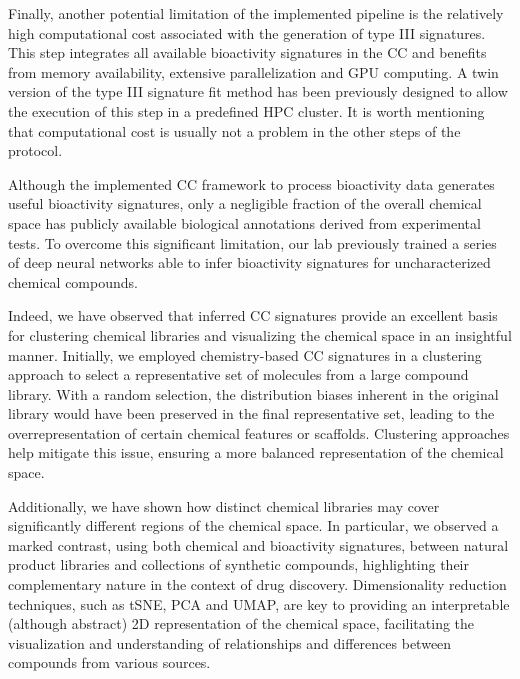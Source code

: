 Finally, another potential limitation of the implemented pipeline is the relatively high computational cost associated with the generation of type III signatures. This step integrates all available bioactivity signatures in the CC and benefits from memory availability, extensive parallelization and GPU computing. A twin version of the type III signature fit method has been previously designed to allow the execution of this step in a predefined HPC cluster. It is worth mentioning that computational cost is usually not a problem in the other steps of the protocol.  


Although the implemented CC framework to process bioactivity data generates useful bioactivity signatures, only a negligible fraction of the overall chemical space has publicly available biological annotations derived from experimental tests. To overcome this significant limitation, our lab previously trained a series of deep neural networks able to infer bioactivity signatures for uncharacterized chemical compounds. 

Indeed, we have observed that inferred CC signatures provide an excellent basis for clustering chemical libraries and visualizing the chemical space in an insightful manner. Initially, we employed chemistry-based CC signatures in a clustering approach to select a representative set of molecules from a large compound library. With a random selection, the distribution biases inherent in the original library would have been preserved in the final representative set, leading to the overrepresentation of certain chemical features or scaffolds. Clustering approaches help mitigate this issue, ensuring a more balanced representation of the chemical space. 

Additionally, we have shown how distinct chemical libraries may cover significantly different regions of the chemical space. In particular, we observed a marked contrast, using both chemical and bioactivity signatures, between natural product libraries and collections of synthetic compounds, highlighting their complementary nature in the context of drug discovery. Dimensionality reduction techniques, such as tSNE, PCA and UMAP, are key to providing an interpretable (although abstract) 2D representation of the chemical space, facilitating the visualization and understanding of relationships and differences between compounds from various sources.

